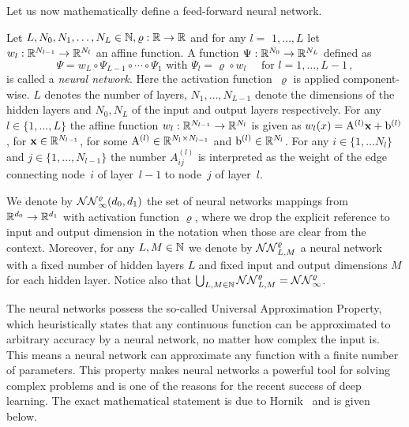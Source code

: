 Let us now mathematically define a feed-forward neural network.

\begin{definition}\label{def:neuralnet}
Let $L, N_{0}, N_{1}, \ldots, N_{L} \in \mathbb{N}, \varrho: \mathbb{R} \rightarrow \mathbb{R}$ and for any $l=$
$1, \ldots, L$ let $w_{l}: \mathbb{R}^{N_{l-1}} \rightarrow \mathbb{R}^{N_{l}}$ an affine function. A function $\Psi: \mathbb{R}^{N_{0}} \rightarrow \mathbb{R}^{N_{L}}$
defined as
\[
\Psi=w_{L} \circ \Psi_{L-1} \circ \cdots \circ \Psi_{1} \text { with } \Psi_{l}=\varrho \circ w_{l} \quad \text { for } l=1, \ldots, L-1\,,
\]
is called a \textit{neural network}. Here the activation function~$\varrho$ is
applied component-wise. $L$ denotes the number of layers, $N_{1}, \ldots, N_{L-1}$ denote
the dimensions of the hidden layers and $N_{0}, N_{L}$ of the input and output layers respectively. 
For any $l\in\{1, \dots, L\}$ the affine function $w_{l}:\mathbb{R}^{N_{l-1}}\to\mathbb{R}^{N_{l}}$ is given as $w_{l}(x) = \mathrm{A}^{(l)} \boldsymbol{\mathrm{x}} + \mathrm{b}^{(l)}$,
for $\boldsymbol{\mathrm{x}}\in \mathbb{R}^{N_{l-1}}$, for some $\mathrm{A}^{(l)} \in \mathbb{R}^{N_{l}\times N_{l-1}} $ and $\mathrm{b}^{(l)} \in \mathbb{R}^{N_{l}}$.
For any $i\in\{1, \dots N_{l}\}$ and $j\in\{1, \dots, N_{l-1}\}$ the number $A_{i j}^{(l)}$ is interpreted as the weight of the edge connecting node~$i$ of layer~$l-1$ to node~$j$ of layer~$l$.
\end{definition}

We denote by $\mathcal{NN}_{\infty}^{\varrho}(d_0,d_1)$ the set of neural networks mappings from $\mathbb{R}^{d_0} \rightarrow \mathbb{R}^{d_1}$ with activation function $\varrho$, where we drop the explicit reference to input and output dimension in the notation when those are clear from the context. %
Moreover, for any $L, M \in \mathbb{N}$ we denote by $\mathcal{NN}_{L, M}^\varrho$ a neural network with a fixed number of hidden layers $L$ and fixed input and output dimensions $M$ for each hidden layer. %
Notice also that $\bigcup_{L,M\in\mathbb{N}}\mathcal{NN}_{L,M}^\varrho = \mathcal{NN}_{\infty}^\varrho$.

The neural networks possess the so-called Universal Approximation Property, which heuristically states that any continuous function can be approximated to arbitrary accuracy by a neural network, no matter how complex the input is. This means a neural network can approximate any function with a finite number of parameters. This property makes neural networks a powerful tool for solving complex problems and is one of the reasons for the recent success of deep learning. The exact mathematical statement is due to Hornik~\cite{Hornik1991ApproximationNetworks} and is given below.

